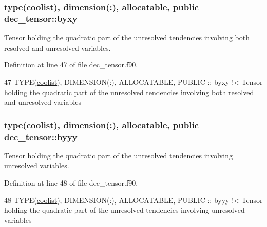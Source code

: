 \subsubsection[{\texorpdfstring{byxy}{byxy}}]{\setlength{\rightskip}{0pt plus 5cm}type({\bf coolist}), dimension(\+:), allocatable, public dec\+\_\+tensor\+::byxy}\hypertarget{namespacedec__tensor_a7c84cc16c29566626a9b6a47dde529f2}{}\label{namespacedec__tensor_a7c84cc16c29566626a9b6a47dde529f2}


Tensor holding the quadratic part of the unresolved tendencies involving both resolved and unresolved variables. 



Definition at line 47 of file dec\+\_\+tensor.\+f90.


\begin{DoxyCode}
47   \textcolor{keywordtype}{TYPE}(\hyperlink{structtensor_1_1coolist}{coolist}), \textcolor{keywordtype}{DIMENSION(:)}, \textcolor{keywordtype}{ALLOCATABLE}, \textcolor{keywordtype}{PUBLIC} :: byxy\textcolor{comment}{ !< Tensor holding the quadratic part of
       the unresolved tendencies involving both resolved and unresolved variables}
\end{DoxyCode}
\subsubsection[{\texorpdfstring{byyy}{byyy}}]{\setlength{\rightskip}{0pt plus 5cm}type({\bf coolist}), dimension(\+:), allocatable, public dec\+\_\+tensor\+::byyy}\hypertarget{namespacedec__tensor_ae146ffac640fe6d4dc52fb31f2c78956}{}\label{namespacedec__tensor_ae146ffac640fe6d4dc52fb31f2c78956}


Tensor holding the quadratic part of the unresolved tendencies involving unresolved variables. 



Definition at line 48 of file dec\+\_\+tensor.\+f90.


\begin{DoxyCode}
48   \textcolor{keywordtype}{TYPE}(\hyperlink{structtensor_1_1coolist}{coolist}), \textcolor{keywordtype}{DIMENSION(:)}, \textcolor{keywordtype}{ALLOCATABLE}, \textcolor{keywordtype}{PUBLIC} :: byyy\textcolor{comment}{ !< Tensor holding the quadratic part of
       the unresolved tendencies involving unresolved variables}
\end{DoxyCode}
